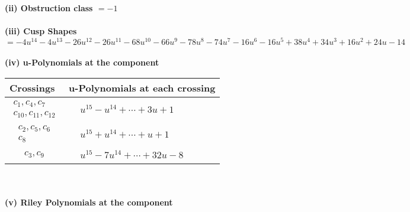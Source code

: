 \documentclass[1p]{elsarticle_modified}
\theoremstyle{definition}
\begin{document}
\flushleft \textbf{(ii) Obstruction class $= -1$}\\~\\
\flushleft \textbf{(iii) Cusp Shapes $= -4 u^{14}-4 u^{13}-26 u^{12}-26 u^{11}-68 u^{10}-66 u^9-78 u^8-74 u^7-16 u^6-16 u^5+38 u^4+34 u^3+16 u^2+24 u-14$}\\~\\
\newpage\renewcommand{\arraystretch}{1}
\flushleft \textbf{(iv) u-Polynomials at the component}\newline \\
\begin{tabular}{m{50pt}|m{274pt}}
Crossings & \hspace{64pt}u-Polynomials at each crossing \\
\hline $$\begin{aligned}c_{1},c_{4},c_{7}\\c_{10},c_{11},c_{12}\end{aligned}$$&$\begin{aligned}
&u^{15}- u^{14}+\cdots+3 u+1
\end{aligned}$\\
\hline $$\begin{aligned}c_{2},c_{5},c_{6}\\c_{8}\end{aligned}$$&$\begin{aligned}
&u^{15}+u^{14}+\cdots+u+1
\end{aligned}$\\
\hline $$\begin{aligned}c_{3},c_{9}\end{aligned}$$&$\begin{aligned}
&u^{15}-7 u^{14}+\cdots+32 u-8
\end{aligned}$\\
\hline
\end{tabular}\\~\\
\newpage\renewcommand{\arraystretch}{1}
\flushleft \textbf{(v) Riley Polynomials at the component}\newline \\
\end{document}
